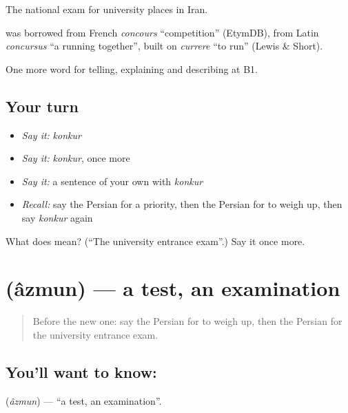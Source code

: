 The national exam for university places in Iran.

\begin{cousinweb}
\textbf{} was borrowed from French \emph{concours} \textquotedblleft{}competition\textquotedblright{} (EtymDB), from Latin \emph{concursus} \textquotedblleft{}a running together\textquotedblright{}, built on \emph{currere} \textquotedblleft{}to run\textquotedblright{} (Lewis \& Short).
\end{cousinweb}

\begin{grammarlens}[title={What you've built}]
One more word for telling, explaining and describing at B1.
\end{grammarlens}

\subsection*{Your turn}
\begin{itemize}
\raggedright
  \item \emph{Say it:} \emph{konkur}
  \item \emph{Say it:} \emph{konkur}, once more
  \item \emph{Say it:} a sentence of your own with \emph{konkur}
  \item \emph{Recall:} say the Persian for a priority, then the Persian for to weigh up, then say \emph{konkur} again
\end{itemize}

\begin{tcolorbox}[breakable,colback=teal!4,colframe=teal!35!black,title={Before you move on}]
What does  mean? (\textquotedblleft{}The university entrance exam\textquotedblright{}.) Say it once more.
\end{tcolorbox}
\section[\texorpdfstring{\fa{آزمون} (âzmun)}{آزمون (âzmun)}]{ (âzmun) — a test, an examination}

\label{lesson:FA-C399-azmun}



\begin{quote}
Before the new one: say the Persian for to weigh up, then the Persian for the university entrance exam.
\end{quote}

\subsection*{You'll want to know: }
\textbf{} (\emph{âzmun}) — \textquotedblleft{}a test, an examination\textquotedblright{}.

